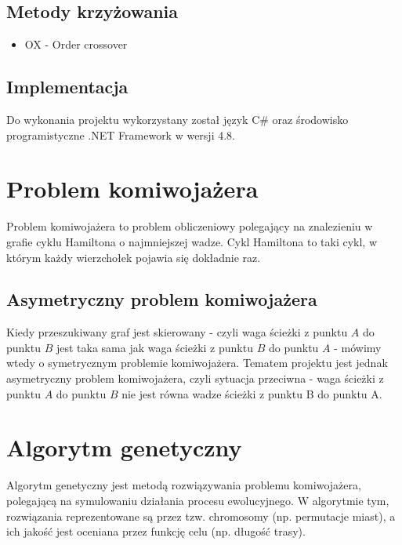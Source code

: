 \documentclass{article}
\begin{document}
\subsection{Metody krzyżowania}
\begin{itemize}
    \item OX - Order crossover
\end{itemize}

\subsection{Implementacja}
Do wykonania projektu wykorzystany został język C\# oraz środowisko programistyczne .NET Framework w wersji 4.8.

\section{Problem komiwojażera}
Problem komiwojażera to problem obliczeniowy polegający na znalezieniu w grafie cyklu Hamiltona o najmniejszej wadze. Cykl Hamiltona to taki cykl, w którym każdy wierzchołek pojawia się dokładnie raz. 

\subsection{Asymetryczny problem komiwojażera}
Kiedy przeszukiwany graf jest skierowany - czyli waga ścieżki z punktu $A$ do punktu $B$ jest taka sama jak waga ścieżki z punktu $B$ do punktu $A$
 - mówimy wtedy o symetrycznym problemie komiwojażera. Tematem projektu jest jednak asymetryczny problem komiwojażera, czyli sytuacja przeciwna - waga ścieżki z punktu $A$ do punktu $B$ nie jest równa wadze ścieżki z punktu B do punktu A.

\newpage
\section{Algorytm genetyczny}
Algorytm genetyczny jest metodą rozwiązywania problemu komiwojażera, polegającą na symulowaniu działania procesu ewolucyjnego. W algorytmie tym, rozwiązania reprezentowane są przez tzw. chromosomy (np. permutacje miast), a ich jakość jest oceniana przez funkcję celu (np. długość trasy).
\end{document}

